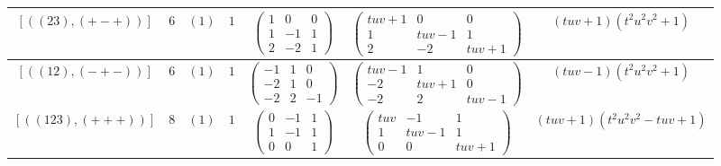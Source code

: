 \documentclass[11pt,english]{amsart}
\numberwithin{equation}{section}
\numberwithin{figure}{section}
\theoremstyle{plain}
\theoremstyle{plain}
\theoremstyle{definition}
\theoremstyle{remark}
\begin{document}
\begin{itemize}
\begin{table}[H]
\begin{tabular}{|c|c|c|c|c|c|c|}
        $[ ((23), (+-+)) ]$ & $6$ & $(1)$ & $1$ & 
        $\begin{pmatrix} 1 & 0 & 0 \\ 1 & -1 & 1 \\ 2 & -2 & 1 \end{pmatrix}$ & 
        $\begin{pmatrix} tuv+1 & 0 & 0 \\ 1 & tuv-1 & 1 \\ 2 & -2 & tuv+1 \end{pmatrix}$ & 
        $(tuv+1)(t^2 u^2 v^2 + 1)$ \\\hline
        
        $[ ((12), (-+-)) ]$ & $6$ & $(1)$ & $1$ & 
        $\begin{pmatrix} -1 & 1 & 0 \\ -2 & 1 & 0 \\ -2 & 2 & -1 \end{pmatrix}$ & 
        $\begin{pmatrix} tuv-1 & 1 & 0 \\ -2 & tuv+1 & 0 \\ -2 & 2 & tuv-1 \end{pmatrix}$ & 
        $(tuv-1)(t^2 u^2 v^2 + 1)$ \\\hline
        
        $[ ((123), (+++)) ]$ & $8$ & $(1)$ & $1$ & 
        $\begin{pmatrix} 0 & -1 & 1 \\ 1 & -1 & 1 \\ 0 & 0 & 1 \end{pmatrix}$ & 
        $\begin{pmatrix} tuv & -1 & 1 \\ 1 & tuv-1 & 1 \\ 0 & 0 & tuv+1 \end{pmatrix}$ & 
        $(tuv+1)(t^2 u^2 v^2 - tuv + 1)$ \\\hline
        

\end{tabular}
\end{table}
\end{itemize}
\end{document}

